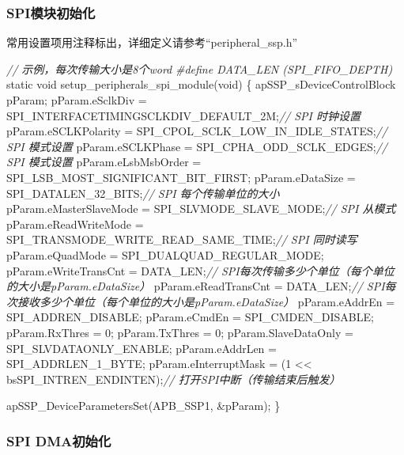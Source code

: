 \documentclass[
  12pt,
]{book}
\newenvironment{Shaded}{\begin{snugshade}}{\end{snugshade}}
\newcommand{\CommentTok}[1]{\textcolor[rgb]{0.56,0.35,0.01}{\textit{#1}}}
\newcommand{\DataTypeTok}[1]{\textcolor[rgb]{0.13,0.29,0.53}{#1}}
\newcommand{\DecValTok}[1]{\textcolor[rgb]{0.00,0.00,0.81}{#1}}
\newcommand{\NormalTok}[1]{#1}
\newcommand{\PreprocessorTok}[1]{\textcolor[rgb]{0.56,0.35,0.01}{\textit{#1}}}
\begin{document}
\hypertarget{spiux6a21ux5757ux521dux59cbux5316-7}{%
\subsubsection{SPI模块初始化}\label{spiux6a21ux5757ux521dux59cbux5316-7}}

常用设置项用注释标出，详细定义请参考``peripheral\_ssp.h''

\begin{Shaded}
\begin{Highlighting}[]
\CommentTok{// 示例，每次传输大小是8个word}
\PreprocessorTok{#define DATA_LEN (SPI_FIFO_DEPTH)}
\DataTypeTok{static} \DataTypeTok{void}\NormalTok{ setup_peripherals_spi_module(}\DataTypeTok{void}\NormalTok{)}
\NormalTok{\{}
\NormalTok{    apSSP_sDeviceControlBlock pParam;}
\NormalTok{    pParam.eSclkDiv = SPI_INTERFACETIMINGSCLKDIV_DEFAULT_2M;}\CommentTok{// SPI 时钟设置}
\NormalTok{    pParam.eSCLKPolarity = SPI_CPOL_SCLK_LOW_IN_IDLE_STATES;}\CommentTok{// SPI 模式设置}
\NormalTok{    pParam.eSCLKPhase = SPI_CPHA_ODD_SCLK_EDGES;}\CommentTok{// SPI 模式设置}
\NormalTok{    pParam.eLsbMsbOrder = SPI_LSB_MOST_SIGNIFICANT_BIT_FIRST;}
\NormalTok{    pParam.eDataSize = SPI_DATALEN_32_BITS;}\CommentTok{// SPI 每个传输单位的大小}
\NormalTok{    pParam.eMasterSlaveMode = SPI_SLVMODE_SLAVE_MODE;}\CommentTok{// SPI 从模式}
\NormalTok{    pParam.eReadWriteMode = SPI_TRANSMODE_WRITE_READ_SAME_TIME;}\CommentTok{// SPI 同时读写}
\NormalTok{    pParam.eQuadMode = SPI_DUALQUAD_REGULAR_MODE;}
\NormalTok{    pParam.eWriteTransCnt = DATA_LEN;}\CommentTok{// SPI每次传输多少个单位（每个单位的大小是pParam.eDataSize）}
\NormalTok{    pParam.eReadTransCnt = DATA_LEN;}\CommentTok{// SPI每次接收多少个单位（每个单位的大小是pParam.eDataSize）}
\NormalTok{    pParam.eAddrEn = SPI_ADDREN_DISABLE;}
\NormalTok{    pParam.eCmdEn = SPI_CMDEN_DISABLE;}
\NormalTok{    pParam.RxThres = }\DecValTok{0}\NormalTok{;}
\NormalTok{    pParam.TxThres = }\DecValTok{0}\NormalTok{;}
\NormalTok{    pParam.SlaveDataOnly = SPI_SLVDATAONLY_ENABLE;}
\NormalTok{    pParam.eAddrLen = SPI_ADDRLEN_1_BYTE;}
\NormalTok{    pParam.eInterruptMask = (}\DecValTok{1}\NormalTok{ << bsSPI_INTREN_ENDINTEN);}\CommentTok{// 打开SPI中断（传输结束后触发）}
  
\NormalTok{    apSSP_DeviceParametersSet(APB_SSP1, &pParam);}
\NormalTok{\}}
\end{Highlighting}
\end{Shaded}

\hypertarget{spi-dmaux521dux59cbux5316-3}{%
\subsubsection{SPI DMA初始化}\label{spi-dmaux521dux59cbux5316-3}}
\end{document}

